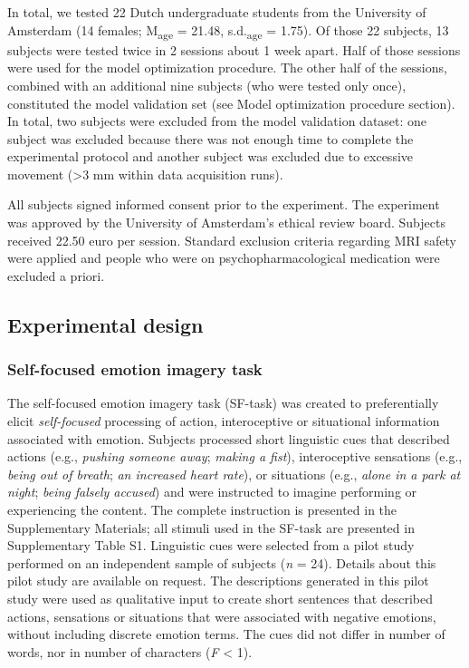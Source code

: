 \documentclass[12pt,american,a4paper,oneside,]{memoir} %
\begin{document}
In total, we tested 22 Dutch undergraduate students from the University of Amsterdam (14 females; M\textsubscript{age} = 21.48, s.d.\textsubscript{age} = 1.75). Of those 22 subjects, 13 subjects were tested twice in 2 sessions about 1 week apart. Half of those sessions were used for the model optimization procedure. The other half of the sessions, combined with an additional nine subjects (who were tested only once), constituted the model validation set (see Model optimization procedure section). In total, two subjects were excluded from the model validation dataset: one subject was excluded because there was not enough time to complete the experimental protocol and another subject was excluded due to excessive movement (\textgreater3 mm within data acquisition runs).

All subjects signed informed consent prior to the experiment. The experiment was approved by the University of Amsterdam's ethical review board. Subjects received 22.50 euro per session. Standard exclusion criteria regarding MRI safety were applied and people who were on psychopharmacological medication were excluded a priori.

\hypertarget{experimental-design}{%
\subsection{Experimental design}\label{experimental-design}}

\hypertarget{self-focused-emotion-imagery-task}{%
\subsubsection{Self-focused emotion imagery task}\label{self-focused-emotion-imagery-task}}

The self-focused emotion imagery task (SF-task) was created to preferentially elicit \emph{self-focused} processing of action, interoceptive or situational information associated with emotion. Subjects processed short linguistic cues that described actions (e.g., \emph{pushing someone away}; \emph{making a fist}), interoceptive sensations (e.g., \emph{being out of breath}; \emph{an increased heart rate}), or situations (e.g., \emph{alone in a park at night}; \emph{being falsely accused}) and were instructed to imagine performing or experiencing the content. The complete instruction is presented in the Supplementary Materials; all stimuli used in the SF-task are presented in Supplementary Table S1. Linguistic cues were selected from a pilot study performed on an independent sample of subjects (\emph{n} = 24). Details about this pilot study are available on request. The descriptions generated in this pilot study were used as qualitative input to create short sentences that described actions, sensations or situations that were associated with negative emotions, without including discrete emotion terms. The cues did not differ in number of words, nor in number of characters (\emph{F} \textless{} 1).
\end{document}
